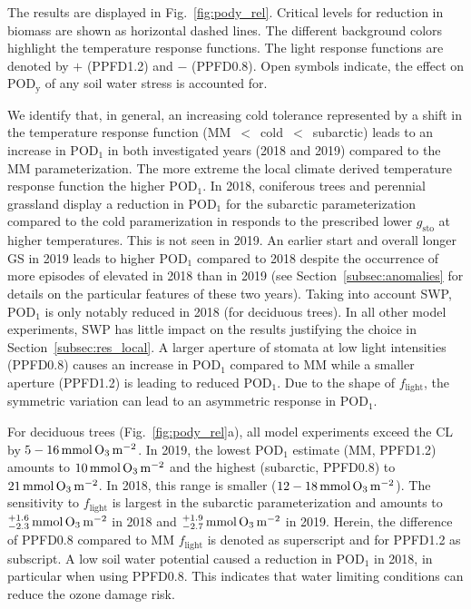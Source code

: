 \documentclass[bg, manuscript]{copernicus}
\begin{document}
The results are displayed in Fig.~\ref{fig:pody_rel}. Critical levels for reduction in biomass \citep[deciduous forest $4\,\unit{\%}$, coniferous forest $2\,\unit{\%}$, and grasslands $10\,\unit{\%}$ adopted from][]{ICP:MappingManual2017,ESPR:Hayes2021} are shown as horizontal dashed lines. The different background colors highlight the temperature response functions. The light response functions are denoted by $+$ (PPFD1.2) and $-$ (PPFD0.8). Open symbols indicate, the effect on $\mathrm{POD_y}$ of any soil water stress is accounted for.

We identify that, in general, an increasing cold tolerance represented by a shift in the temperature response function (MM~$<$~cold~$<$~subarctic) leads to an increase in $\mathrm{POD_1}$ in both investigated years (2018 and 2019) compared to the MM parameterization. The more extreme the local climate derived temperature response function the higher $\mathrm{POD_1}$. In 2018, coniferous trees and perennial grassland display a reduction in $\mathrm{POD_1}$ for the subarctic parameterization compared to the cold paramerization in responds to the prescribed lower $g_\mathrm{sto}$ at higher temperatures. This is not seen in 2019. An earlier start and overall longer GS in 2019 leads to higher $\mathrm{POD_1}$ compared to 2018 despite the occurrence of more episodes of elevated  in 2018 than in 2019 (see Section~\ref{subsec:anomalies} for details on the particular features of these two years). Taking into account SWP, $\mathrm{POD_1}$ is only notably reduced in 2018 (for deciduous trees). In all other model experiments, SWP has little impact on the results justifying the choice in Section~\ref{subsec:res_local}. A larger aperture of stomata at low light intensities (PPFD0.8) causes an increase in $\mathrm{POD_1}$ compared to MM while a smaller aperture (PPFD1.2) is leading to reduced $\mathrm{POD_1}$. Due to the shape of $f_\mathrm{light}$, the symmetric variation can lead to an asymmetric response in $\mathrm{POD_1}$.

For deciduous trees (Fig.~\ref{fig:pody_rel}a), all model experiments exceed the CL by $5-16\,\unit{mmol\,\chem{O_3}\,m^{-2}}$. In 2019, the lowest $\mathrm{POD_1}$ estimate (MM, PPFD1.2) amounts to $10\,\unit{mmol\,\chem{O_3}\,m^{-2}}$ and the highest (subarctic, PPFD0.8) to $21\,\unit{mmol\,\chem{O_3}\,m^{-2}}$. In 2018, this range is smaller ($12-18\,\unit{mmol\,\chem{O_3}\,m^{-2}}$). The sensitivity to $f_\mathrm{light}$ is largest in the subarctic parameterization and amounts to $^{+1.6}_{-2.3}\,\unit{mmol\,\chem{O_3}\,m^{-2}}$ in 2018 and $^{+1.9}_{-2.7}\,\unit{mmol\,\chem{O_3}\,m^{-2}}$ in 2019. Herein, the difference of PPFD0.8 compared to MM $f_\mathrm{light}$ is denoted as superscript and for PPFD1.2 as subscript. A low soil water potential caused a reduction in $\mathrm{POD_1}$ in 2018, in particular when using PPFD0.8. This indicates that water limiting conditions can reduce the ozone damage risk.
\end{document}
